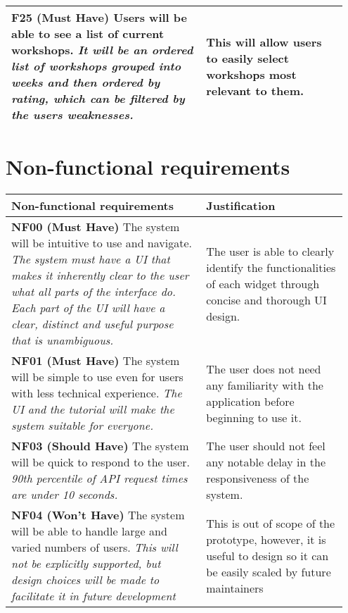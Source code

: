 \documentclass[10pt]{article}
\begin{document}
\begin{longtable}{|p{0.55\linewidth}|p{0.4\linewidth}|}
    \textbf{F25 (Must Have) }
    Users will be able to see a list of current workshops.
    \textit{It will be an ordered list of workshops grouped into weeks and then
    ordered by rating, which can be filtered by the users weaknesses.}
    &
    This will allow users to easily select workshops most relevant to them.
    \\ \hline

\end{longtable}


\vspace{-4mm}\section{Non-functional requirements}\vspace{-2mm}
\begin{longtable}{|p{0.55\linewidth}|p{0.4\linewidth}|}
    \hline
    \textbf{Non-functional requirements}
        &
    \textbf{Justification}
    \\ \hline\hline

    \textbf{NF00 (Must Have) }
    The system will be intuitive to use and navigate.
    \textit{The system must have a UI that makes it inherently clear to the user
    what all parts of the interface do. Each part of the UI will have a clear,
    distinct and useful purpose that is unambiguous.}
        &
    The user is able to clearly identify the functionalities of each widget
    through concise and thorough UI design.
    \\ \hline

    \textbf{NF01 (Must Have) }
    The system will be simple to use even for users with less technical experience.
    \textit{The UI and the tutorial will make the system suitable for everyone.}
        &
    The user does not need any familiarity with the application before beginning
    to use it.
    \\ \hline

    \textbf{NF03 (Should Have) }
    The system will be quick to respond to the user.
    \textit{90th percentile of API request times are under 10 seconds.}
        &
    The user should not feel any notable delay in the responsiveness of the
    system.
    \\ \hline

    \textbf{NF04 (Won't Have) }
    The system will be able to handle large and varied numbers of users.
    \textit{This will not be explicitly supported, but design choices will be
    made to facilitate it in future development}
        &
    This is out of scope of the prototype, however, it is useful to design so
    it can be easily scaled by future maintainers
    \\ \hline


\end{longtable}
\end{document}
